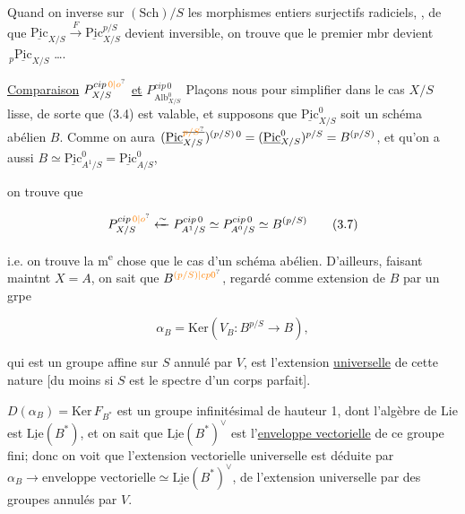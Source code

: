 Quand on inverse sur $(\mathrm{Sch})/S$ les  morphismes entiers surjectifs radiciels, , de  que $\underline{\mathrm{Pic}}_{X/S}\xrightarrow F\underline{\mathrm{Pic}}_{X/S}^{p/S}$ devient inversible, on trouve que le  premier mbr devient $\,{}_p\underline{\mathrm{Pic}}_{X/S}$ \ldots.

\uline{Comparaison}  $P^{cip\,\unsure{0|o}}_{X/S}$ \uline{et} $P^{cip\,0}_{\mathrm{Alb}^0_{X/S}}$ Plaçons nous pour simplifier dans le cas $X/S$ lisse, de sorte que (3.4) est valable, et supposons que $\underline{\mathrm{Pic}}^0_{X/S}$ soit un schéma abélien $B$. Comme on aura $(\underline{\mathrm{Pic}}^{\deleted{\unsure{p/S}}}_{X/S})^{(p/S)\,0}=(\underline{\mathrm{Pic}}^0_{X/S})^{p/S}=B^{(p/S)}$,   et qu'on a aussi $B\simeq\underline{\mathrm{Pic}}^0_{A^1/S}=\underline{\mathrm{Pic}}^0_{A/S}$,


on trouve que

\[
P^{cip\,\unsure{0|o}}_{X/S}\xleftarrow{\sim}P^{cip\,0}_{A^1/S}\simeq P^{cip\,0}_{A^0/S}\simeq B^{(p/S)}\tag*{(3.7)}
\]

i.e. on trouve la m\textsuperscript{e} chose que  le cas d'un schéma abélien.  D'ailleurs, faisant  maintnt $X=A$, on sait que $B^{\unsure{(p/S)|cp0}}$, regardé comme extension de $B$ par un grpe 

\[
\alpha_B=\mathrm{Ker}(V_B:B^{p/S}\to B),
\]

qui est un groupe affine sur $S$ annulé par $V$, est l'extension \uline{universelle} de cette nature [du moins  si $S$ est le spectre d'un corps parfait].

$D(\alpha_B)=\mathrm{Ker}\,F_{B^*}$  est un groupe infinitésimal de hauteur 1, dont l'algèbre de Lie est $\underline{\mathrm{Lie}}(B^*)$, et on sait que $\underline{\mathrm{Lie}}(B^*)^\vee$ est l'\uline{enveloppe vectorielle} de ce groupe fini; donc on voit que l'extension vectorielle universelle est déduite par $\alpha_B\longrightarrow\text{enveloppe vectorielle}\simeq\underline{\mathrm{Lie}}(B^*)^\vee$, de l'extension universelle par des groupes annulés par $V$.

